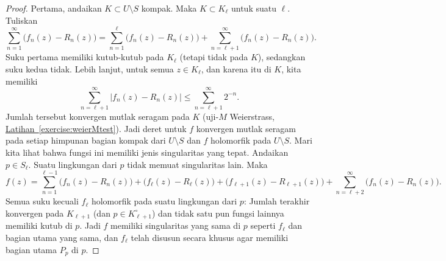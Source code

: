 \documentclass[12pt,openany]{book}
\newcommand{\abs}[1]{\left\lvert {#1} \right\rvert}
\theoremstyle{plain}
\theoremstyle{remark}
\theoremstyle{definition}
\theoremstyle{exercise}
\theoremstyle{example}
\newcommand{\exerciseref}[1]{\hyperref[#1]{Latihan~\ref*{#1}}}
\begin{document}
\begin{proof}
Pertama, andaikan $K \subset U \setminus S$ kompak.  Maka $K \subset
K_\ell$ untuk suatu $\ell$.  Tuliskan
\begin{equation*}
\sum_{n=1}^\infty \bigl( f_n(z) - R_n(z) \bigr)
=
\sum_{n=1}^{\ell} \bigl( f_n(z) - R_n(z) \bigr)
+
\sum_{n=\ell+1}^\infty \bigl( f_n(z) - R_n(z) \bigr) .
\end{equation*}
Suku pertama memiliki kutub-kutub pada $K_\ell$ (tetapi tidak pada $K$),
sedangkan suku kedua tidak.  Lebih lanjut, untuk semua $z \in K_\ell$, dan
karena itu di $K$, kita memiliki
\begin{equation*}
\sum_{n=\ell+1}^\infty \abs{ f_n(z) - R_n(z) }
\leq
\sum_{n=\ell+1}^\infty 2^{-n} .
\end{equation*}
Jumlah tersebut konvergen mutlak seragam pada $K$ (uji-$M$ Weierstrass,
\exerciseref{exercise:weierMtest}).
Jadi deret untuk $f$ konvergen mutlak seragam
pada setiap himpunan bagian kompak dari $U \setminus S$ dan $f$ holomorfik pada $U
\setminus S$.  Mari kita lihat bahwa fungsi ini memiliki jenis singularitas yang tepat.
Andaikan $p \in S_\ell$.  Suatu lingkungan dari $p$ tidak memuat
singularitas lain.  Maka
\begin{equation*}
f(z) = 
\sum_{n=1}^{\ell-1} \bigl( f_n(z) - R_n(z) \bigr)
+
\bigl( f_\ell(z) - R_\ell(z) \bigr)
+
\bigl( f_{\ell+1}(z) - R_{\ell+1}(z) \bigr)
+
\sum_{n=\ell+2}^\infty \bigl( f_n(z) - R_n(z) \bigr) .
\end{equation*}
Semua suku kecuali $f_\ell$ holomorfik pada suatu lingkungan dari $p$:
Jumlah terakhir konvergen pada $K_{\ell+1}$ (dan $p \in K_{\ell+1}^{\circ}$)
dan tidak satu pun fungsi lainnya memiliki
kutub di $p$.
Jadi $f$ memiliki singularitas yang sama di $p$ seperti $f_\ell$ dan bagian utama
yang sama, dan $f_\ell$ telah disusun secara khusus agar memiliki bagian utama
$P_p$ di $p$.
\end{proof}
\end{document}
